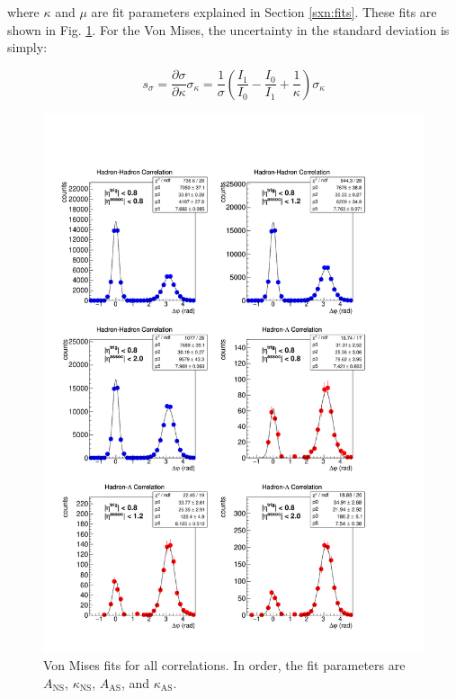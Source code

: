 \documentclass[../main.tex]{subfiles}
\begin{document}
where $\kappa$ and $\mu$ are fit parameters explained in Section \ref{sxn:fits}. These fits are shown in Fig. \ref{fig:mises_fits}. For the Von Mises, the uncertainty in the standard deviation is simply:

\begin{equation}
    s_\sigma = \frac{\partial \sigma}{\partial \kappa} \sigma_\kappa = \frac{1}{\sigma} \left(\frac{I_1}{I_0} - \frac{I_0}{I_1} + \frac{1}{\kappa}\right) \sigma_\kappa
\end{equation}

\begin{figure}
    \centering
    \includegraphics[scale=0.75]{appendix/figs/mises_fit.pdf}
    \caption{Von Mises fits for all correlations. In order, the fit parameters are $A_{\text{NS}}$, $\kappa_{\text{NS}}$, $A_{\text{AS}}$, and $\kappa_{\text{AS}}$.}
    \label{fig:mises_fits}
\end{figure}
\end{document}
